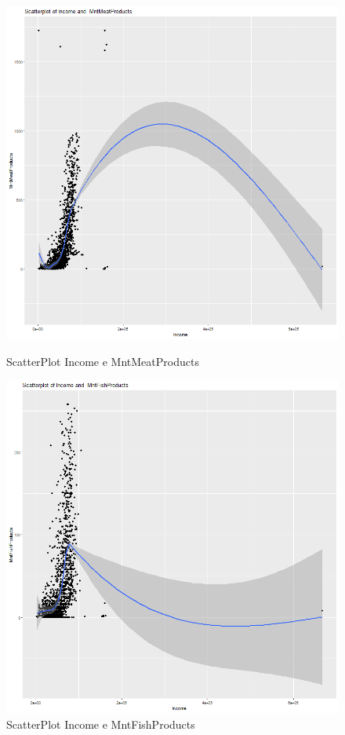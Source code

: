 \documentclass[letterpaper,11pt]{article}
\begin{document}
\begin{figure}[h]
  \centering
  \begin{minipage}[b]{0.4\textwidth}
    \includegraphics[width=\textwidth]{Img/EDA/EDA011.png}
    \caption{ScatterPlot Income e MntMeatProducts}
     \label{fig:ScatterPlotIncomeMntMeat}
  \end{minipage}
  \hfill
  \begin{minipage}[b]{0.4\textwidth}
    \includegraphics[width=\textwidth]{Img/EDA/EDA012.png}
    \caption{ScatterPlot Income e MntFishProducts}
     \label{fig:ScatterPlotIncomeMntFish}
  \end{minipage}
\end{figure}
\end{document}
